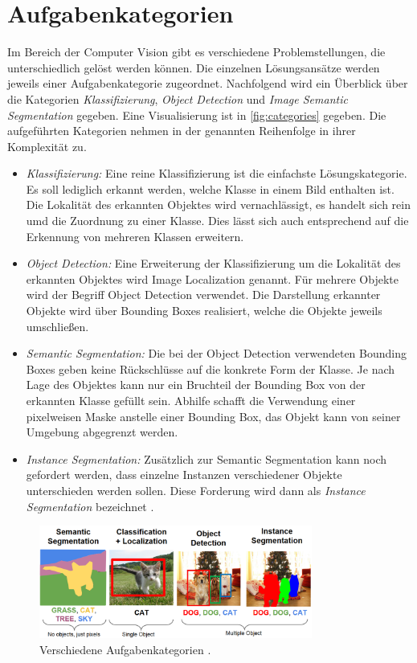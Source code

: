 \section{Aufgabenkategorien} \label{sec:aufgabenkategorien}
Im Bereich der Computer Vision gibt es verschiedene Problemstellungen, die unterschiedlich gelöst werden können.
Die einzelnen Lösungsansätze werden jeweils einer Aufgabenkategorie zugeordnet.
Nachfolgend wird ein Überblick über die Kategorien \textit{Klassifizierung}, \textit{Object Detection} und \textit{Image Semantic Segmentation} gegeben.
Eine Visualisierung ist in \autoref{fig:categories} gegeben.
Die aufgeführten Kategorien nehmen in der genannten Reihenfolge in ihrer Komplexität zu.

\begin{itemize}
	\item \textit{Klassifizierung:}
	Eine reine Klassifizierung ist die einfachste Lösungskategorie. 
	Es soll lediglich erkannt werden, welche Klasse in einem Bild enthalten ist.
	Die Lokalität des erkannten Objektes wird vernachlässigt, es handelt sich rein umd die Zuordnung zu einer Klasse.
	Dies lässt sich auch entsprechend auf die Erkennung von mehreren Klassen erweitern.
	
	\item \textit{Object Detection:}
	Eine Erweiterung der Klassifizierung um die Lokalität des erkannten Objektes wird Image Localization genannt.
	Für mehrere Objekte wird der Begriff Object Detection verwendet.
	Die Darstellung erkannter Objekte wird über Bounding Boxes realisiert, welche die Objekte jeweils umschließen.

	\item \textit{Semantic Segmentation:}
	Die bei der Object Detection verwendeten Bounding Boxes geben keine Rückschlüsse auf die konkrete Form der Klasse.
	Je nach Lage des Objektes kann nur ein Bruchteil der Bounding Box von der erkannten Klasse gefüllt sein.
	Abhilfe schafft die Verwendung einer pixelweisen Maske anstelle einer Bounding Box, das Objekt kann von seiner Umgebung abgegrenzt werden.

	\item \textit{Instance Segmentation:}
	Zusätzlich zur Semantic Segmentation kann noch gefordert werden, dass einzelne Instanzen verschiedener Objekte 
	unterschieden werden sollen.
	Diese Forderung wird dann als \textit{Instance Segmentation} bezeichnet \cite{Sharma.21.08.2019}.
\end{itemize}

\begin{figure}
	\centering
	\includegraphics[width=0.8\textwidth]{Bilder/categories.png} 
	\caption{Verschiedene Aufgabenkategorien \cite{.10.11.2022}.}
	\label{fig:categories}
\end{figure} 


